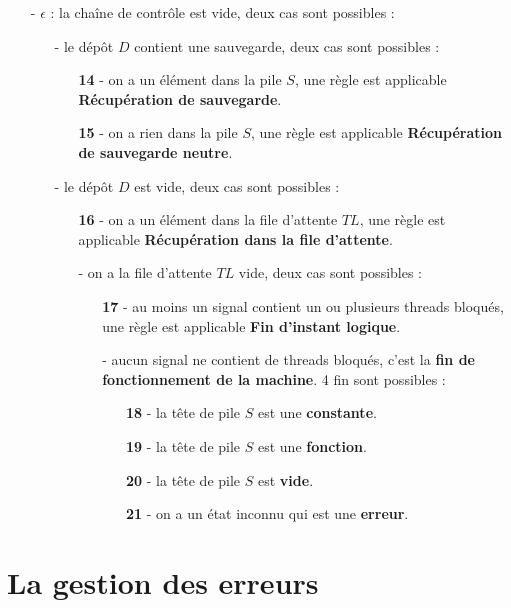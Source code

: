 \documentclass[10pt,a4paper]{report}
\begin{document}
\begin{enumerate}
		\item[-] $\epsilon$ : la chaîne de contrôle est vide, deux cas sont possibles :
		\begin{enumerate}
			\item[-] le dépôt $D$ contient une sauvegarde, deux cas sont possibles :
			\begin{enumerate}
				\item[\textbf{14} -] on a un élément dans la pile $S$, une règle est applicable \textbf{Récupération de sauvegarde}.
				\item[\textbf{15} -] on a rien dans la pile $S$, une règle est applicable \textbf{Récupération de sauvegarde neutre}.  
			\end{enumerate}
			\item[-] le dépôt $D$ est vide, deux cas sont possibles :
			\begin{enumerate}
				\item[\textbf{16} -] on a un élément dans la file d'attente $TL$, une règle est applicable \textbf{Récupération dans la file d'attente}.
				\item[-] on a la file d'attente $TL$ vide, deux cas sont possibles :
				\begin{enumerate}
					\item[\textbf{17} -] au moins un signal contient un ou plusieurs threads bloqués, une règle est applicable \textbf{Fin d'instant logique}.
					\item[-] aucun signal ne contient de threads bloqués, c'est la \textbf{fin de fonctionnement de la machine}. 4 fin sont possibles :
					\begin{enumerate}
						\item[\textbf{18} -] la tête de pile $S$ est une \textbf{constante}.
						\item[\textbf{19} -] la tête de pile $S$ est une \textbf{fonction}.
						\item[\textbf{20} -] la tête de pile $S$ est \textbf{vide}.
						\item[\textbf{21} -] on a un état inconnu qui est une \textbf{erreur}.
					\end{enumerate}	  
				\end{enumerate}
			\end{enumerate}
		\end{enumerate}
	\end{enumerate}
	\newpage
	
	
	
	\section{La gestion des erreurs}
	
\end{document}

